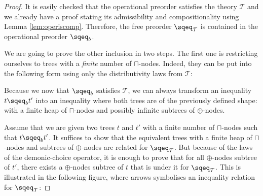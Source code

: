 \begin{proof}
    
    It is easily checked that the operational preorder satisfies the theory 
    $\mathcal{T}$ and we already have a proof stating its admissibility and 
    compositionality using Lemma \ref{lem:operiscomp}. Therefore, the free preorder 
    $\sqeq_\mathcal{T}$ is contained in the operational preorder $\sqeq_b$.

    We are going to prove the other inclusion in two steps. The first one 
    is restricting ourselves to trees with a \emph{finite} number of
    $\sqcap$-nodes. Indeed, they can be put into the following form 
    using only the distributivity laws from $\mathcal{T}$:

    \begin{center}
    \end{center}

    Because we now that $\sqeq_b$ satisfies $\mathcal{T}$, we can 
    always transform an inequality $t \sqeq_b t'$ into an inequality 
    where both trees are of the previously defined shape: with a finite 
    heap of $\sqcap$-nodes and possibly infinite subtrees of $\oplus$-nodes.

    Assume that we are given two trees $t$ and $t'$ with a finite number 
    of $\sqcap$-nodes such that $t \sqeq_b t'$. It suffices to show that 
    the equivalent trees with a finite heap of $\sqcap$-nodes and subtrees 
    of $\oplus$-nodes are related for $\sqeq_\mathcal{T}$. But because 
    of the laws of the demonic-choice operator, it is enough to prove that 
    for all $\oplus$-nodes subtree of $t'$, there exists a $\oplus$-nodes
    subtree of $t$ that is under it for $\sqeq_\mathcal{T}$. This is illustrated 
    in the following figure, where arrows symbolises an inequality relation for
    $\sqeq_\mathcal{T}$:


\end{proof}
